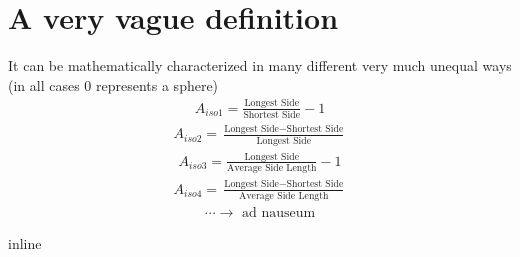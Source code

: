 \documentclass[letterpaper,10pt,english]{sphinxmanual}
\begin{document}
\section{A very vague definition}
\label{\detokenize{06-ShapeAnalysis:a-very-vague-definition}}
\sphinxAtStartPar
It can be mathematically characterized in many different very much unequal ways (in all cases 0 represents a sphere)
\begin{equation*}
\begin{split} A_{iso1} = \frac{\text{Longest Side}}{\text{Shortest Side}} - 1 \end{split}
\end{equation*}\begin{equation*}
\begin{split} A_{iso2} = \frac{\text{Longest Side}-\text{Shortest Side}}{\text{Longest Side}} \end{split}
\end{equation*}\begin{equation*}
\begin{split} A_{iso3} = \frac{\text{Longest Side}}{\text{Average Side Length}} - 1 \end{split}
\end{equation*}\begin{equation*}
\begin{split} A_{iso4} = \frac{\text{Longest Side}-\text{Shortest Side}}{\text{Average Side Length}} \end{split}
\end{equation*}\begin{equation*}
\begin{split} \cdots \rightarrow \text{ ad nauseum} \end{split}
\end{equation*}
\begin{sphinxVerbatim}[commandchars=\\\{\}]
   
   
   
   
   
 inline
\end{sphinxVerbatim}
\end{document}
